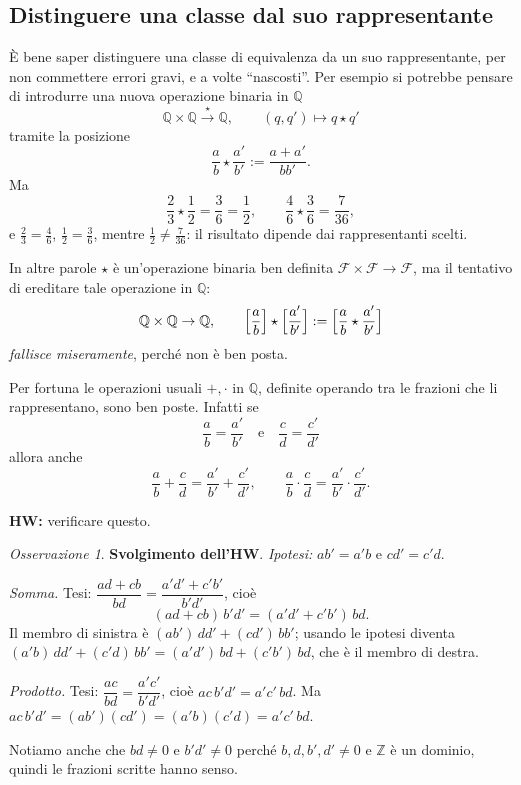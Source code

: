 \documentclass[11pt,a4paper]{article}
\newcommand{\Z}{\mathbb{Z}}
\newcommand{\Q}{\mathbb{Q}}
\newcommand{\Fr}{\mathcal{F}}
\theoremstyle{definition}
\theoremstyle{plain}
\theoremstyle{remark}
\newtheorem*{osservazione}{Osservazione}
\begin{document}
\subsection{Distinguere una classe dal suo rappresentante}

\`E bene saper distinguere una classe di equivalenza da un suo rappresentante, per non commettere errori gravi, e a volte ``nascosti''.
Per esempio si potrebbe pensare di introdurre una nuova operazione binaria in $\Q$
\[
\Q\times\Q\xrightarrow{\ \star\ }\Q,\qquad (q,q')\longmapsto q\star q'
\]
tramite la posizione
\[
\frac{a}{b}\star\frac{a'}{b'}:=\frac{a+a'}{bb'} .
\]
Ma
\[
\frac{2}{3}\star\frac{1}{2}=\frac{3}{6}=\frac{1}{2},
\qquad
\frac{4}{6}\star\frac{3}{6}=\frac{7}{36},
\]
e $\frac{2}{3}=\frac{4}{6}$, $\frac{1}{2}=\frac{3}{6}$, mentre $\frac12\neq\frac{7}{36}$: il risultato dipende dai rappresentanti scelti.

In altre parole $\star$ \`e un'operazione binaria ben definita $\Fr\times\Fr\to\Fr$, ma il tentativo di ereditare tale operazione in $\Q$:
\[
\Q\times\Q\to\Q,\qquad \Bigl[\frac{a}{b}\Bigr]\star\Bigl[\frac{a'}{b'}\Bigr]:=\Bigl[\frac{a}{b}\star\frac{a'}{b'}\Bigr]
\]
\emph{fallisce miseramente}, perch\'e non \`e ben posta.

Per fortuna le operazioni usuali $+,\cdot$ in $\Q$, definite operando tra le frazioni che li rappresentano, sono ben poste. Infatti se
\[
\frac{a}{b}=\frac{a'}{b'}\quad\text{e}\quad\frac{c}{d}=\frac{c'}{d'}
\]
allora anche
\[
\frac{a}{b}+\frac{c}{d}=\frac{a'}{b'}+\frac{c'}{d'},\qquad
\frac{a}{b}\cdot\frac{c}{d}=\frac{a'}{b'}\cdot\frac{c'}{d'} .
\]

\textbf{HW:} verificare questo.

\begin{osservazione}
\textbf{Svolgimento dell'HW}. 
\emph{Ipotesi:} $ab'=a'b$ e $cd'=c'd$.

\emph{Somma.} Tesi: $\dfrac{ad+cb}{bd}=\dfrac{a'd'+c'b'}{b'd'}$, cio\`e
\[
(ad+cb)\,b'd'=(a'd'+c'b')\,bd .
\]
Il membro di sinistra \`e $(ab')\,dd'+(cd')\,bb'$; usando le ipotesi diventa $(a'b)\,dd'+(c'd)\,bb'=(a'd')\,bd+(c'b')\,bd$, che \`e il membro di destra.

\emph{Prodotto.} Tesi: $\dfrac{ac}{bd}=\dfrac{a'c'}{b'd'}$, cio\`e $ac\,b'd'=a'c'\,bd$. Ma $ac\,b'd'=(ab')(cd')=(a'b)(c'd)=a'c'\,bd$.

Notiamo anche che $bd\neq0$ e $b'd'\neq0$ perch\'e $b,d,b',d'\neq0$ e $\Z$ \`e un dominio, quindi le frazioni scritte hanno senso.
\end{osservazione}
\end{document}

